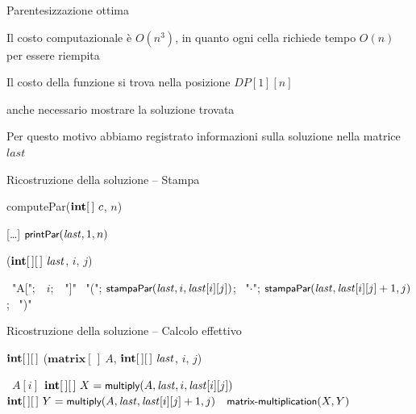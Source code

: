 \begin{frame}{Parentesizzazione ottima}

\vspace{-6pt}
\begin{myboxtitle}[Considerazioni]
\BIL
\item Il costo computazionale è $O(n^3)$, in quanto ogni cella richiede tempo $O(n)$ per essere riempita
\item Il costo della funzione si trova nella posizione $DP[1][n]$
\item \EE anche necessario mostrare la soluzione trovata
\item Per questo motivo abbiamo registrato informazioni sulla soluzione nella matrice $\mathit{last}$
\EIL
\end{myboxtitle}

\end{frame}

\begin{frame}{Ricostruzione della soluzione -- Stampa}

\vspace{-6pt}
\begin{Procedure}
\caption[A]{\textsf{computePar}($\INTARRAY\ c$, \INTEGER $n$)}	
[\ldots]\;
$\textsf{{\small printPar}}(\mathit{last}, 1, n)$\;
\end{Procedure}


\begin{Procedure}
\caption[A]{($\INTARRAY[\,]\ \mathit{last}$, \INTEGER $i$, \INTEGER $j$)}
{ \PRINT\ "A[";\ \PRINT\ $i$;\ \PRINT\ "]"\; }
{
  \PRINT\ "("; 
  $\textsf{{\small stampaPar}}(\mathit{last}, i, \mathit{last}[i][j])$; 
  \PRINT\ "$\cdot$"; 
  $\textsf{{\small stampaPar}}(\mathit{last}, \mathit{last}[i][j]+1, j)$; 
  \PRINT\ ")"\;
}
\end{Procedure}

\end{frame}

\begin{frame}{Ricostruzione della soluzione -- Calcolo effettivo}

\vspace{-6pt}
\begin{Procedure}
\caption[A]{$\INTARRAY[\,]$ ($\mathbf{matrix}[\,]\ A$, $\INTARRAY[\,]\ \mathit{last}$, \INTEGER $i$, \INTEGER $j$)}
{ \Return\ $A[i]$\; }
{
  $\INTARRAY[\,]\ X = \fontproc{multiply}(A, \mathit{last}, i, \mathit{last}[i][j])$\;
  $\INTARRAY[\,]\ Y = \fontproc{multiply}(A, \mathit{last}, \mathit{last}[i][j]+1, j)$\;
  \Return\ $\textsf{{\small matrix-multiplication}}(X,Y)$\;
}
\end{Procedure}

\end{frame}


